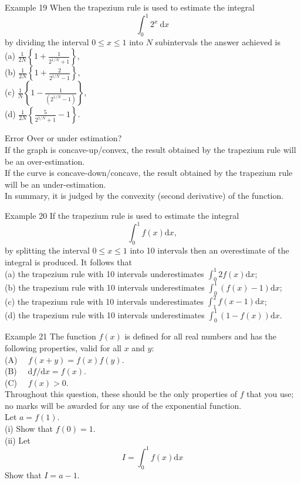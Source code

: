 \documentclass{beamer}
\begin{document}
\begin{frame}{Example 19}
When the trapezium rule is used to estimate the integral
$$
\int_0^1 2^x \mathrm{~d} x
$$
by dividing the interval $0 \leqslant x \leqslant 1$ into $N$ subintervals the answer achieved is\\
(a) $\frac{1}{2 N}\left\{1+\frac{1}{2^{1 / N}+1}\right\}$,\\
(b) $\frac{1}{2 N}\left\{1+\frac{2}{2^{1 / N}-1}\right\}$,\\
(c) $\frac{1}{N}\left\{1-\frac{1}{\left(2^{1 / N}-1\right)}\right\}$,\\
(d) $\frac{1}{2 N}\left\{\frac{5}{2^{1 / N}+1}-1\right\}$.
\end{frame}

\begin{frame}{Error}
     Over or under estimation?\\
   If the graph is concave-up/convex, the result obtained by the trapezium rule will be an over-estimation.\\
   If the curve is concave-down/concave, the result obtained by the trapezium rule will be an under-estimation.\\
   In summary, it is judged by the convexity (second derivative) of the function.
\end{frame}

\begin{frame}{Example 20}
If the trapezium rule is used to estimate the integral
$$
\int_0^1 f(x) \mathrm{d} x,
$$
by splitting the interval $0 \leqslant x \leqslant 1$ into 10 intervals then an overestimate of the integral is produced. It follows that\\
(a) the trapezium rule with 10 intervals underestimates $\int_0^1 2 f(x) \mathrm{d} x$;\\
(b) the trapezium rule with 10 intervals underestimates $\int_0^1(f(x)-1) \mathrm{d} x$;\\
(c) the trapezium rule with 10 intervals underestimates $\int_1^2 f(x-1) \mathrm{d} x$;\\
(d) the trapezium rule with 10 intervals underestimates $\int_0^1(1-f(x)) \mathrm{d} x$.
\end{frame}

\begin{frame}{Example 21}
The function $f(x)$ is defined for all real numbers and has the following properties, valid for all $x$ and $y$:\\
(A) $\quad f(x+y)=f(x) f(y)$.\\
(B) $\quad \mathrm{d} f / \mathrm{d} x=f(x)$.\\
(C) $\quad f(x)>0$.\\
Throughout this question, these should be the only properties of $f$ that you use; no marks will be awarded for any use of the exponential function.\\
Let $a=f(1)$.\\
(i) Show that $f(0)=1$.\\
(ii) Let
$$
I=\int_0^1 f(x) \mathrm{d} x
$$
Show that $I=a-1$.
\end{frame}
\end{document}
